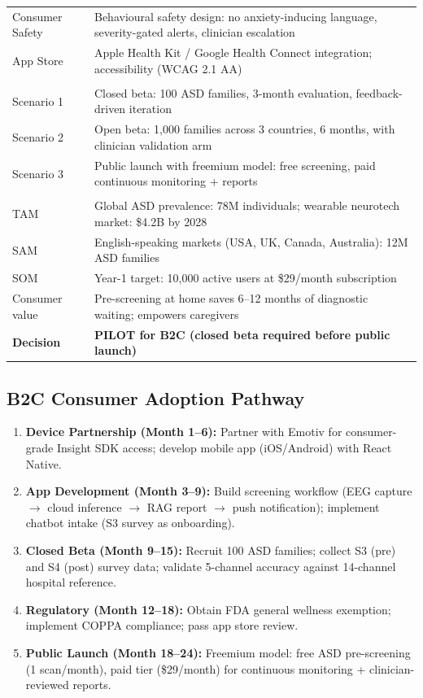 {\begin{xltabular}{\textwidth}{@{} >{\raggedright\arraybackslash}p{2.5cm} L @{}}
Consumer Safety & Behavioural safety design: no anxiety-inducing language, severity-gated alerts, clinician escalation \\
App Store & Apple Health Kit / Google Health Connect integration; accessibility (WCAG 2.1 AA) \\
\midrule
{} \\
\addlinespace
Scenario 1 & Closed beta: 100 ASD families, 3-month evaluation, feedback-driven iteration \\
Scenario 2 & Open beta: 1,000 families across 3 countries, 6 months, with clinician validation arm \\
Scenario 3 & Public launch with freemium model: free screening, paid continuous monitoring + reports \\
\midrule
{} \\
\addlinespace
TAM & Global ASD prevalence: 78M individuals; wearable neurotech market: \$4.2B by 2028 \\
SAM & English-speaking markets (USA, UK, Canada, Australia): 12M ASD families \\
SOM & Year-1 target: 10,000 active users at \$29/month subscription \\
Consumer value & Pre-screening at home saves 6--12 months of diagnostic waiting; empowers caregivers \\
\midrule
\textbf{Decision} & \textbf{PILOT for B2C (closed beta required before public launch)} \\
\end{xltabular}}

\subsection{B2C Consumer Adoption Pathway}

\begin{enumerate}[label=\textbf{Stage \arabic*:}, leftmargin=2.5cm]
    \item \textbf{Device Partnership (Month 1--6):} Partner with Emotiv for consumer-grade Insight SDK access; develop mobile app (iOS/Android) with React Native.
    \item \textbf{App Development (Month 3--9):} Build screening workflow (EEG capture $\to$ cloud inference $\to$ RAG report $\to$ push notification); implement chatbot intake (S3 survey as onboarding).
    \item \textbf{Closed Beta (Month 9--15):} Recruit 100 ASD families; collect S3 (pre) and S4 (post) survey data; validate 5-channel accuracy against 14-channel hospital reference.
    \item \textbf{Regulatory (Month 12--18):} Obtain FDA general wellness exemption; implement COPPA compliance; pass app store review.
    \item \textbf{Public Launch (Month 18--24):} Freemium model: free ASD pre-screening (1 scan/month), paid tier (\$29/month) for continuous monitoring + clinician-reviewed reports.
\end{enumerate}

